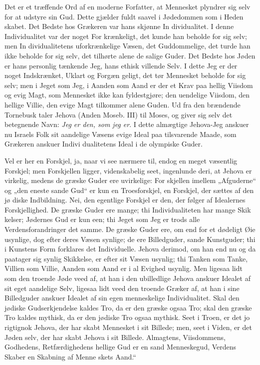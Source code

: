 \documentclass[12pt]{book}
\newcommand{\opage}[1]{\marginnote{\footnotesize\textit{[#1]}}}
\begin{document}
Det er et træffende Ord af en moderne Forfatter,
\opage{96}\setcounter{footnote}{0}%
at Mennesket plyndrer sig selv for at udstyre sin Gud.
Dette gjælder fuldt saavel i Jødedommen som i Heden\-%
skabet. Det Bedste hos Grækeren var hans skjønne In\-%
dividualitet. I denne Individualitet var der noget For\-%
krænkeligt, det kunde han beholde for sig selv; men In\-%
dividualitetens uforkrænkelige Væsen, det Guddommelige,
det turde han ikke beholde for sig selv, det tilhørte
alene de salige Guder. Det Bedste hos Jøden er hans
personlig tænkende Jeg, hans ethisk villende Selv. I
dette Jeg er der noget Indskrænket, Uklart og Forgæn\-%
geligt, det tør Mennesket beholde for sig selv; men i
Jeget som Jeg, i Aanden som Aand er der et Krav paa
hellig Viisdom og evig Magt, som Mennesket ikke kan
fyldestgjøre; den uendelige Viisdom, den hellige Villie,
den evige Magt tilkommer alene Guden. Ud fra den
brændende Tornebusk taler Jehova (Anden Moseb. III)
til Moses, og giver sig selv det betegnende Navn: \emph{Jeg
er den, som jeg er}. I dette almægtige Jehova-Jeg
anskuer nu Israels Folk sit aandelige Væsens evige Ideal
paa tilsvarende Maade, som Grækeren anskuer Indivi\-%
dualitetens Ideal i de olympiske Guder.

Vel er her en Forskjel, ja, naar vi see nærmere til,
endog en meget væsentlig Forskjel; men Forskjellen
ligger, videnskabelig seet, ingenlunde deri, at Jehova er
virkelig, medens de græske Guder ere uvirkelige: For\-%
skjellen imellem „Afguderne“ og „den eneste sande Gud“ er
kun en Troesforskjel, en Forskjel, der sættes af den jø\-%
diske Indbildning. Nei, den egentlige Forskjel er den,
der følger af Idealernes Forskjellighed. De græske
Guder ere mange; thi Individualiteten har mange Skik\-%
kelser; Jødernes Gud er kun een; thi Jeget som Jeg er
trods alle Verdensforandringer det samme. De græske Guder
ere, om end for et dødeligt Øie usynlige, dog efter deres
Væsen synlige; de ere Billedguder, sande Kunstguder;
\opage{97}\setcounter{footnote}{0}%
thi i Kunstens Form forklares det Individuelle. Jehova
derimod, om han end nu og da paatager sig synlig
Skikkelse, er efter sit Væsen usynlig; thi Tanken som
Tanke, Villien som Villie, Aanden som Aand er i al
Evighed usynlig. Men ligesaa lidt som den troende
Jøde veed af, at han i den ubilledlige Jehova anskuer
Idealet af sit eget aandelige Selv, ligesaa lidt veed den
troende Græker af, at han i sine Billedguder anskuer
Idealet af sin egen menneskelige Individualitet. Skal
den jødiske Gudserkjendelse kaldes Tro, da er den
græske ogsaa Tro; skal den græske Tro kaldes mythisk,
da er den jødiske Tro ogsaa mythisk. Seet i Troen, er
det jo rigtignok Jehova, der har skabt Mennesket i sit
Billede; men, seet i Viden, er det Jøden selv, der har
skabt Jehova i sit Billede. Almagtens, Viisdommens,
Godhedens, Retfærdighedens hellige Gud er en sand
Menneskegud, Verdens Skaber en Skabning af Menne\-%
skets Aand.“ %
\end{document}
